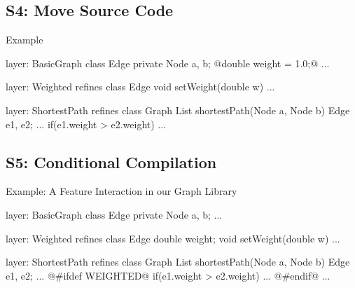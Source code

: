 \subsection{S4: Move Source Code}

\begin{frame}{\myframetitle}
\end{frame}

\begin{frame}[fragile]{Example}
	\begin{mycolumns}[widths={50,50},animation=none]
\begin{codetight}{layer: BasicGraph}
class Edge {
	private Node a, b;
	@double weight = 1.0;@
	...
}
\end{codetight}	
\begin{codetight}{layer: Weighted}
refines class Edge {
	void setWeight(double w){ ... }
}
\end{codetight}	
	\mynextcolumn
\begin{codetight}{layer: ShortestPath}
refines class Graph {
	List shortestPath(Node a, Node b){
		Edge e1, e2;
		...
		if(e1.weight > e2.weight) 
		... 
	}
}
\end{codetight}	
	\end{mycolumns}
\end{frame}

\subsection{S5: Conditional Compilation}

\begin{frame}{\myframetitle}
\end{frame}

\begin{frame}[fragile]{Example: A Feature Interaction in our Graph Library}
	\begin{mycolumns}[widths={50,50},animation=none]
\begin{codetight}{layer: BasicGraph}
class Edge {
	private Node a, b;
	...
}
\end{codetight}	
\begin{codetight}{layer: Weighted}
refines class Edge {
	double weight;
	void setWeight(double w){ ... }
}
\end{codetight}	
	\mynextcolumn
\begin{codetight}{layer: ShortestPath}
refines class Graph {
	List shortestPath(Node a, Node b){
		Edge e1, e2;
		...
@#ifdef WEIGHTED@		
		if(e1.weight > e2.weight) ...
@#endif@
		... 
	}
}
\end{codetight}	
	\end{mycolumns}
\end{frame}

